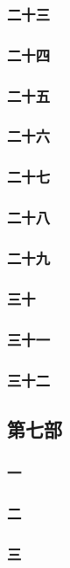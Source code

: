 \subsubsection*{二十三}
\subsubsection*{二十四}
\subsubsection*{二十五}
\subsubsection*{二十六}
\subsubsection*{二十七}
\subsubsection*{二十八}
\subsubsection*{二十九}
\subsubsection*{三十}
\subsubsection*{三十一}
\subsubsection*{三十二}






\subsection*{第七部}



\subsubsection*{一}
\subsubsection*{二}
\subsubsection*{三}

